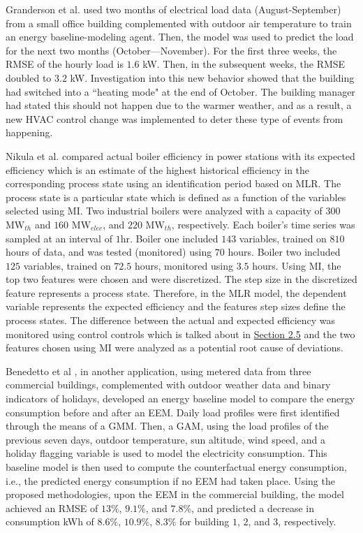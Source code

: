 Granderson et al. \cite{lawrence-lab} used two months of electrical load data (August-September) from a small office building complemented with outdoor air temperature to train an energy baseline-modeling agent. Then, the model was used to predict the load for the next two months (October—November). For the first three weeks, the \ac{RMSE} of the hourly load is $1.6$ \ac{kW}. Then, in the subsequent weeks, the RMSE doubled to $3.2$ kW. Investigation into this new behavior showed that the building had switched into a ``heating mode" at the end of October. The building manager had stated this should not happen due to the warmer weather, and as a result, a new \ac{HVAC} control change was implemented to deter these type of events from happening. 

Nikula et al.\cite{boiler} compared actual boiler efficiency in power stations with its expected efficiency which is an estimate of the highest historical efficiency in the corresponding process state using an identification period based on MLR. The process state is a particular state which is defined as a function of the variables selected using \ac{MI}. Two industrial boilers were analyzed with a capacity of $300$ $\text{MW}_{th}$ and $160$ $\text{MW}_{elec}$, and $220$ $\text{MW}_{th}$, respectively. Each boiler's time series was sampled at an interval of $1$hr. Boiler one included $143$ variables, trained on $810$ hours of data, and was tested (monitored) using $70$ hours. Boiler two included $125$ variables, trained on $72.5$ hours, monitored using $3.5$ hours. Using MI, the top two features were chosen and were discretized. The step size in the discretized feature represents a process state. Therefore, in the MLR model, the dependent variable represents the expected efficiency and the features step sizes define the process states. The difference between the actual and expected efficiency was monitored using control controls which is talked about in \hyperlink{subsection.2.5}{Section 2.5} and the two features chosen using MI were analyzed as a potential root cause of deviations.

Benedetto et al \cite{data-driven-MV}, in another application, using metered data from three commercial buildings, complemented with outdoor weather data and binary indicators of holidays, developed an energy baseline model to compare the energy consumption before and after an \ac{EEM}. Daily load profiles were first identified through the means of a \ac{GMM}. Then, a \ac{GAM}, using the load profiles of the previous seven days, outdoor temperature, sun altitude, wind speed, and a holiday flagging variable is used to model the electricity consumption. This baseline model is then used to compute the counterfactual energy consumption, i.e., the predicted energy consumption if no EEM had taken place. Using the proposed methodologies, upon the EEM in the commercial building, the model achieved an RMSE of $13\%$, $9.1\%$, and $7.8\%$, and predicted a decrease in consumption \ac{kWh} of $8.6\%$, $10.9\%$, $8.3\%$ for building $1$, $2$, and $3$, respectively.

